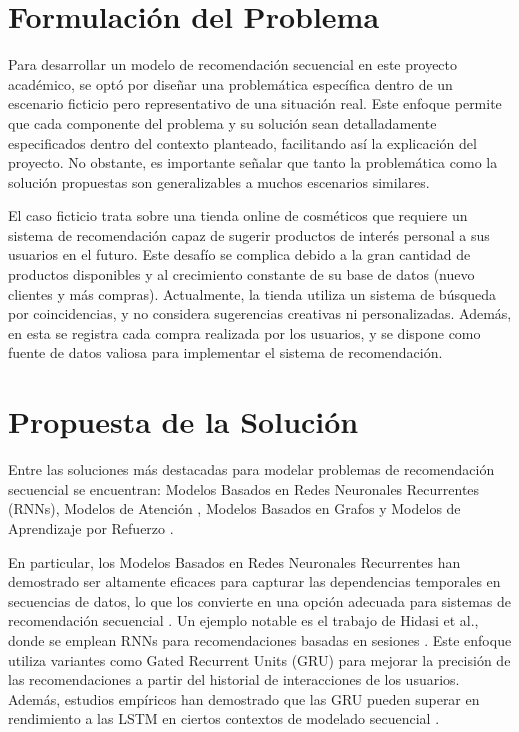 \documentclass[runningheads]{llncs}
\begin{document}
\section{Formulación del Problema}

Para desarrollar un modelo de recomendación secuencial en este proyecto académico, se optó por diseñar una problemática específica dentro de un escenario ficticio pero representativo de una situación real. Este enfoque permite que cada componente del problema y su solución sean detalladamente especificados dentro del contexto planteado, facilitando así la explicación del proyecto. No obstante, es importante señalar que tanto la problemática como la solución propuestas son generalizables a muchos escenarios similares.

El caso ficticio trata sobre una tienda online de cosméticos que requiere un sistema de recomendación capaz de sugerir productos de interés personal a sus usuarios en el futuro. Este desafío se complica debido a la gran cantidad de productos disponibles y al crecimiento constante de su base de datos (nuevo clientes y más compras). Actualmente, la tienda utiliza un sistema de búsqueda por coincidencias, y no considera sugerencias creativas ni personalizadas. Además, en esta se registra cada compra realizada por los usuarios, y se dispone como fuente de datos valiosa para implementar el sistema de recomendación.

\section{Propuesta de la Solución}

Entre las soluciones más destacadas para modelar problemas de recomendación secuencial se encuentran: Modelos Basados en Redes Neuronales Recurrentes (RNNs), Modelos de Atención \cite{kang2018self}, Modelos Basados en Grafos \cite{escamillasistema} y Modelos de Aprendizaje por Refuerzo \cite{ali2024analyzing}.

En particular, los Modelos Basados en Redes Neuronales Recurrentes han demostrado ser altamente eficaces para capturar las dependencias temporales en secuencias de datos, lo que los convierte en una opción adecuada para sistemas de recomendación secuencial \cite{goodfellow2016deep}. Un ejemplo notable es el trabajo de Hidasi et al., donde se emplean RNNs para recomendaciones basadas en sesiones \cite{hidasi2016session}. Este enfoque utiliza variantes como Gated Recurrent Units (GRU) para mejorar la precisión de las recomendaciones a partir del historial de interacciones de los usuarios. Además, estudios empíricos han demostrado que las GRU pueden superar en rendimiento a las LSTM en ciertos contextos de modelado secuencial \cite{chung2014empirical}.
\end{document}
